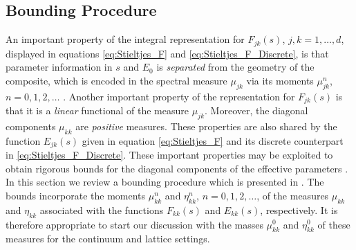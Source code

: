 \documentclass{cmslatex}
\begin{document}
\subsection{Bounding Procedure}\label{sec:Bounding_Procedure}
%
An important property of the integral representation for $F_{jk}(s)$,
$j,k=1,\ldots,d$, displayed in equations \eqref{eq:Stieltjes_F} and
\eqref{eq:Stieltjes_F_Discrete}, is that parameter information in $s$
and $E_0$ is \emph{separated} from the geometry of the composite,
which is encoded in the spectral measure $\mu_{jk}$ via its moments  
$\mu^n_{jk}$, $n=0,1,2,\ldots$ \cite{Bruno:JSP-365,Golden:CMP-473}. Another
important property of the representation for $F_{jk}(s)$ is that it
is a \emph{linear} functional of the measure $\mu_{jk}$. Moreover, the
diagonal components $\mu_{kk}$ are \emph{positive} measures. These
properties are also shared by the function $E_{jk}(s)$ given in
equation \eqref{eq:Stieltjes_F} and its discrete counterpart in
\eqref{eq:Stieltjes_F_Discrete}. These important properties may be
exploited to obtain rigorous bounds for the diagonal components of the
effective parameters
\cite{Bergman:PRC-377,Bergman:PRL-1285,Milton:APL-300,Golden:CMP-473,Bergman:AP-78}. 
In this section we review a bounding procedure which is presented in 
\cite{Golden:CMP-473,Golden:JMPS-333}. The bounds incorporate the
moments $\mu_{kk}^n$ and $\eta_{kk}^n$, $n=0,1,2,\ldots$, of the measures
$\mu_{kk}$ and $\eta_{kk}$ associated with the functions $F_{kk}(s)$ and
$E_{kk}(s)$, respectively. It is therefore appropriate to start our
discussion with the masses $\mu_{kk}^0$ and $\eta_{kk}^0$ of these measures
for the continuum and lattice settings. 
\end{document}
